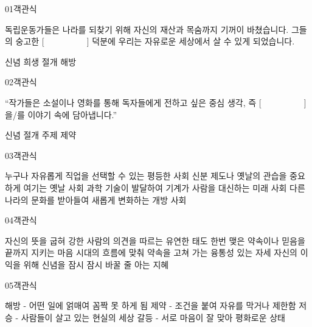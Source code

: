 \documentclass[fs95,seriesFre]{korfarm-base}
\begin{document}
\begin{kfQBlock}{01}{객관식}
\begin{kfEvidence}독립운동가들은 나라를 되찾기 위해 자신의 재산과 목숨까지 기꺼이 바쳤습니다. 그들의 숭고한 [　　　　　] 덕분에 우리는 자유로운 세상에서 살 수 있게 되었습니다.\end{kfEvidence}
\begin{kfChoices}
\kfChoice 신념
\kfChoice 희생
\kfChoice 절개
\kfChoice 해방
\end{kfChoices}
\end{kfQBlock}

\begin{kfQBlock}{02}{객관식}
\begin{kfEvidence}“작가들은 소설이나 영화를 통해 독자들에게 전하고 싶은 중심 생각, 즉 [　　　　　]을/를 이야기 속에 담아냅니다.”\end{kfEvidence}
\begin{kfChoices}
\kfChoice 신념
\kfChoice 절개
\kfChoice 주제
\kfChoice 제약
\end{kfChoices}
\end{kfQBlock}

\begin{kfQBlock}{03}{객관식}
\begin{kfChoices}
\kfChoice 누구나 자유롭게 직업을 선택할 수 있는 평등한 사회
\kfChoice 신분 제도나 옛날의 관습을 중요하게 여기는 옛날 사회
\kfChoice 과학 기술이 발달하여 기계가 사람을 대신하는 미래 사회
\kfChoice 다른 나라의 문화를 받아들여 새롭게 변화하는 개방 사회
\end{kfChoices}
\end{kfQBlock}

\begin{kfQBlock}{04}{객관식}
\begin{kfChoices}
\kfChoice 자신의 뜻을 굽혀 강한 사람의 의견을 따르는 유연한 태도
\kfChoice 한번 맺은 약속이나 믿음을 끝까지 지키는 마음
\kfChoice 시대의 흐름에 맞춰 약속을 고쳐 가는 융통성 있는 자세
\kfChoice 자신의 이익을 위해 신념을 잠시 잠시 바꿀 줄 아는 지혜
\end{kfChoices}
\end{kfQBlock}

\begin{kfQBlock}{05}{객관식}
\begin{kfChoices}
\kfChoice 해방 - 어떤 일에 얽매여 꼼짝 못 하게 됨
\kfChoice 제약 - 조건을 붙여 자유를 막거나 제한함
\kfChoice 저승 - 사람들이 살고 있는 현실의 세상
\kfChoice 갈등 - 서로 마음이 잘 맞아 평화로운 상태
\end{kfChoices}
\end{kfQBlock}
\end{document}

